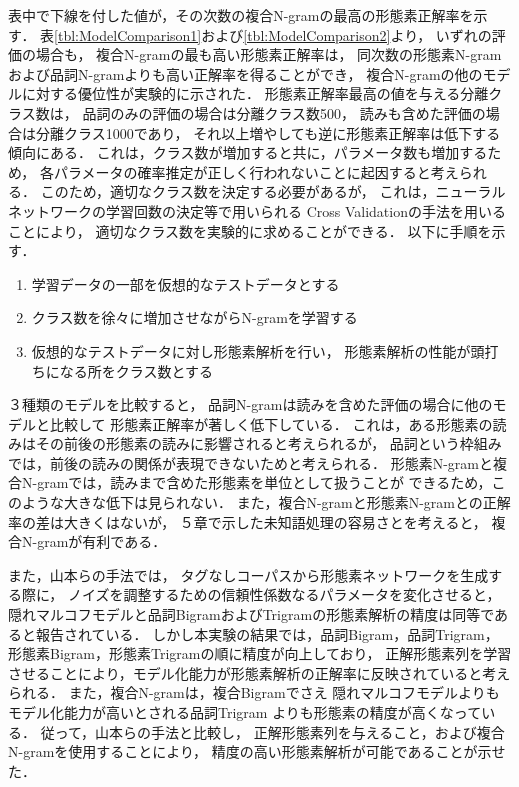 表中で下線を付した値が，その次数の複合N-gramの最高の形態素正解率を示す．
表\ref{tbl:ModelComparison1}および\ref{tbl:ModelComparison2}より，
いずれの評価の場合も，
複合N-gramの最も高い形態素正解率は，
同次数の形態素N-gramおよび品詞N-gramよりも高い正解率を得ることができ，
複合N-gramの他のモデルに対する優位性が実験的に示された．
形態素正解率最高の値を与える分離クラス数は，
品詞のみの評価の場合は分離クラス数500，
読みも含めた評価の場合は分離クラス1000であり，
それ以上増やしても逆に形態素正解率は低下する傾向にある．
これは，クラス数が増加すると共に，パラメータ数も増加するため，
各パラメータの確率推定が正しく行われないことに起因すると考えられる．
このため，適切なクラス数を決定する必要があるが，
これは，ニューラルネットワークの学習回数の決定等で用いられる
Cross Validationの手法を用いることにより，
適切なクラス数を実験的に求めることができる．
以下に手順を示す．
\begin{enumerate}
\item 学習データの一部を仮想的なテストデータとする
\item クラス数を徐々に増加させながらN-gramを学習する
\item 仮想的なテストデータに対し形態素解析を行い，
      形態素解析の性能が頭打ちになる所をクラス数とする
\end{enumerate}


３種類のモデルを比較すると，
品詞N-gramは読みを含めた評価の場合に他のモデルと比較して
形態素正解率が著しく低下している．
これは，ある形態素の読みはその前後の形態素の読みに影響されると考えられるが，
品詞という枠組みでは，前後の読みの関係が表現できないためと考えられる．
形態素N-gramと複合N-gramでは，読みまで含めた形態素を単位として扱うことが
できるため，このような大きな低下は見られない．
また，複合N-gramと形態素N-gramとの正解率の差は大きくはないが，
５章で示した未知語処理の容易さとを考えると，
複合N-gramが有利である．

また，山本らの手法\cite{Yamamoto}では，
タグなしコーパスから形態素ネットワークを生成する際に，
ノイズを調整するための信頼性係数なるパラメータを変化させると，
隠れマルコフモデルと品詞BigramおよびTrigramの形態素解析の精度は同等であると報告されている．
しかし本実験の結果では，品詞Bigram，品詞Trigram，形態素Bigram，形態素Trigramの順に精度が向上しており，
正解形態素列を学習させることにより，モデル化能力が形態素解析の正解率に反映されていると考えられる．
また，複合N-gramは，複合Bigramでさえ
隠れマルコフモデルよりもモデル化能力が高いとされる品詞Trigram
よりも形態素の精度が高くなっている．
従って，山本らの手法と比較し，
正解形態素列を与えること，および複合N-gramを使用することにより，
精度の高い形態素解析が可能であることが示せた．

